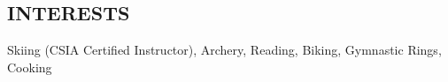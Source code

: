 \documentclass{res}
\begin{document}
\begin{resume}

\section{INTERESTS}
  \vspace{3mm}
  Skiing (CSIA Certified Instructor), Archery, Reading, Biking, Gymnastic Rings, Cooking
  
 
\end{resume}
\end{document}
